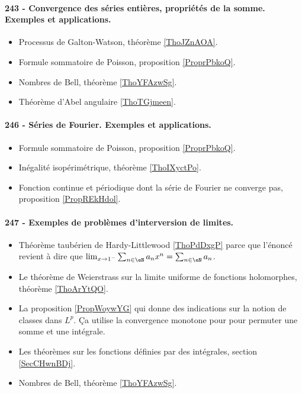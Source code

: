 \paragraph{243 - Convergence des séries entières, propriétés de la somme. Exemples et applications.}
\begin{itemize}
    \item Processus de Galton-Watson, théorème \ref{ThoJZnAOA}.
    \item Formule sommatoire de Poisson, proposition \ref{ProprPbkoQ}.
    \item Nombres de Bell, théorème \ref{ThoYFAzwSg}.
    \item Théorème d'Abel angulaire \ref{ThoTGjmeen}.
\end{itemize}
\paragraph{246 - Séries de Fourier. Exemples et applications.}
\begin{itemize}
    \item Formule sommatoire de Poisson, proposition \ref{ProprPbkoQ}.
    \item Inégalité isopérimétrique, théorème \ref{ThoIXyctPo}.
    \item Fonction continue et périodique dont la série de Fourier ne converge pas, proposition \ref{PropREkHdol}.
\end{itemize}
\paragraph{247 - Exemples de problèmes d’interversion de limites.}
\begin{itemize}
    \item Théorème taubérien de Hardy-Littlewood \ref{ThoPdDxgP} parce que l'énoncé revient à dire que \( \lim_{x\to 1^-} \sum_{n\in \eN}a_nx^n=\sum_{n\in \eN}a_n\).
    \item Le théorème de Weierstrass sur la limite uniforme de fonctions holomorphes, théorème \ref{ThoArYtQO}.
    \item La proposition \ref{PropWoywYG} qui donne des indications sur la notion de classes dans \( L^p\). Ça utilise la convergence monotone pour  pour permuter une somme et une intégrale.
    \item Les théorèmes sur les fonctions définies par des intégrales, section \ref{SecCHwnBDj}.
    \item Nombres de Bell, théorème \ref{ThoYFAzwSg}.
\end{itemize}
